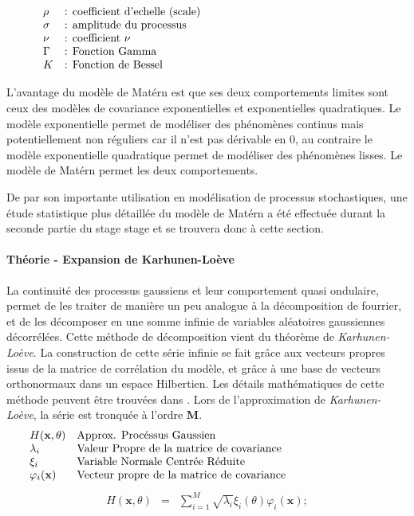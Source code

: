 \documentclass[a4paper,10pt]{article}
\begin{document}
   \[
      \begin{array}{lp{0.8\linewidth}}	
	    \rho   & : coefficient d'echelle (scale) \\
	    \sigma & : amplitude du processus \\
		\nu    & : coefficient $\nu$ 	\\
		\Gamma & : Fonction Gamma \\
		K      & : Fonction de Bessel
      \end{array}
   \]	

L'avantage du modèle de Matérn est que ses deux comportements limites sont ceux des modèles de covariance exponentielles et exponentielles  quadratiques. Le modèle exponentielle permet de modéliser des phénomènes continus mais potentiellement non réguliers car il n'est pas dérivable en 0, au contraire le modèle exponentielle quadratique permet de modéliser des phénomènes lisses. Le modèle de Matérn permet les deux comportements. \smallskip

De par son importante utilisation en modélisation de processus stochastiques, une étude statistique plus détaillée du modèle de Matérn a été effectuée durant la seconde partie du stage stage et se trouvera donc à cette section. \smallskip 

\paragraph{Théorie - Expansion de Karhunen-Loève} 

La continuité des processus gaussiens et leur comportement quasi ondulaire, permet de les traiter de manière un peu analogue à la décomposition de fourrier, et de les décomposer en une somme infinie de variables aléatoires gaussiennes décorrélées. Cette méthode de décomposition vient du théorème de \emph{Karhunen-Loève}. \smallskip
La construction de cette série infinie se fait grâce aux vecteurs propres issus de la matrice de corrélation du modèle, et grâce à une base de vecteurs orthonormaux dans un espace Hilbertien. Les détails mathématiques de cette méthode peuvent être trouvées dans \cite{Sudret2000Jan}. \smallskip
Lors de l’approximation de \emph{Karhunen-Loève}, la série est tronquée à l'ordre \textbf{M}.
   \[
      \begin{array}{lp{0.8\linewidth}}
         H(\textbf{x}, \theta) & Approx. Procéssus Gaussien \\
         \lambda_{i}          & Valeur Propre de la matrice de covariance \\
         \xi_{i}             & Variable Normale Centrée Réduite \\
         \varphi_{i}(\textbf{x}) & Vecteur propre de la matrice de covariance
      \end{array}
   \]
   \begin{eqnarray}
H(\textbf{x}, \theta) & = & \sum_{i=1}^{M}\sqrt{\lambda_{i}}\xi_{i}(\theta)\varphi_{i}(\textbf{x});
   \end{eqnarray}\\
\end{document}

